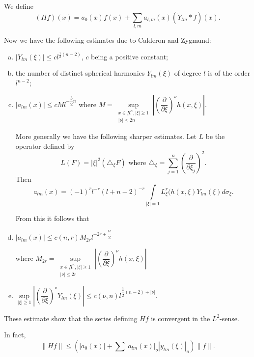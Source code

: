 We define 
\begin{equation*}
(Hf) (x) = a_0 (x) f(x) + \sum_{l,m} a_{l,m}(x) (\widetilde{Y}_{lm}
  *f) (x). \tag{4.8} \label{chap3-eq4.8}
\end{equation*}

Now we have the following estimates due to Calderon and Zygmund: 
\begin{enumerate}[(a)]
\item $| Y_{lm}( \xi ) | \leq c l^{\frac{1}{2}(n-2)}$, $c$ being a
  positive constant; 

\item the number of distinct spherical harmonics $Y_{lm} (\xi)$ of
  degree $l$ is of the order $ l^{n-2}$;  

\item $| a_{lm} (x)| \leq c M l^{- \dfrac{3}{2} n}$ where $ M = \sup
  \limits_{\substack{x \in \underbar{R}^n, | \xi | \geq 1 \\ | \nu | 
      \leq 2n}} | (\dfrac{\partial}{\partial \xi})^\nu h (x, \xi ) | $. 

More generally we have the following sharper estimates. Let $ L$ be
the operator defined by  
$$ 
L(F) = |\xi|^2 (\triangle_\xi F) \text{ where } \triangle _\xi  =
\sum^n_{j =1} \left(\frac{\partial}{\partial \xi_j} \right)^2. 
$$
Then 
\begin{equation*}
a_{lm} (x) = (-1) ^r l^{-r}(l+n-2)^{-r} \int \limits_{|\xi | = 1}
L^r_\xi (h(x, \xi ) Y_{lm} (\xi ) d \sigma_\xi. \tag*{$(4.7)'$} 
\end{equation*}

From this it follows that 
\item $ | a_{lm}(x) | \leq c(n, r) M_{2r} l^{-2r + \dfrac{n}{2}}$ 

\noindent
where $M_{2r} = \sup\limits_{\substack {x \in \underbar{R}^n, | \xi|
    \geq 1 \\ | \nu | \leq 2r}} | (\dfrac{\partial}{\partial \xi})^\nu
h (x, \xi ) |$ 

\item $\sup \limits_{|  \xi |  \geq 1} | (\dfrac{\partial}{\partial
  \xi})^\nu  Y_{lm} ( \xi ) | \leq c (\nu, n) l^{\dfrac{1}{2}(n-2)+ |
  \nu |}$.\pageoriginale 
\end{enumerate}

These estimate show that the series defining $Hf$ is convergent in the
$ L^2$-sense.  

In fact, 
\begin{equation*}
\parallel Hf \parallel \leq (| a_0 (x) | + \sum | a_{lm}(x) |_o |y_{lm}
( \xi ) |_o ) \parallel f \parallel. \tag{4.9} \label{chap3-eq4.9}
\end{equation*}

